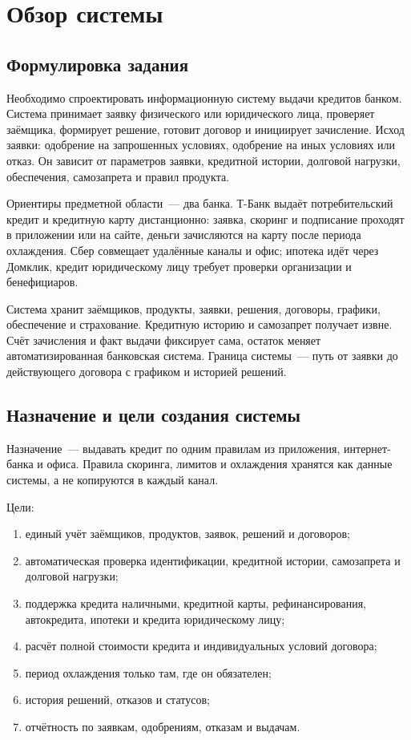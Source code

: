 \documentclass[14pt,a4paper]{extarticle}
\begin{document}
\section{Обзор системы}

\subsection{Формулировка задания}

Необходимо спроектировать информационную систему выдачи кредитов банком. Система принимает заявку физического или юридического лица, проверяет заёмщика, формирует решение, готовит договор и инициирует зачисление. Исход заявки: одобрение на запрошенных условиях, одобрение на иных условиях или отказ. Он зависит от параметров заявки, кредитной истории, долговой нагрузки, обеспечения, самозапрета и правил продукта.

Ориентиры предметной области~--- два банка. Т-Банк выдаёт потребительский кредит и кредитную карту дистанционно: заявка, скоринг и подписание проходят в приложении или на сайте, деньги зачисляются на карту после периода охлаждения. Сбер совмещает удалённые каналы и офис; ипотека идёт через Домклик, кредит юридическому лицу требует проверки организации и бенефициаров.

Система хранит заёмщиков, продукты, заявки, решения, договоры, графики, обеспечение и страхование. Кредитную историю и самозапрет получает извне. Счёт зачисления и факт выдачи фиксирует сама, остаток меняет автоматизированная банковская система. Граница системы~--- путь от заявки до действующего договора с графиком и историей решений.

\subsection{Назначение и цели создания системы}

Назначение~--- выдавать кредит по одним правилам из приложения, интернет-банка и офиса. Правила скоринга, лимитов и охлаждения хранятся как данные системы, а не копируются в каждый канал.

Цели:

\begin{enumerate}
\item единый учёт заёмщиков, продуктов, заявок, решений и договоров;
\item автоматическая проверка идентификации, кредитной истории, самозапрета и долговой нагрузки;
\item поддержка кредита наличными, кредитной карты, рефинансирования, автокредита, ипотеки и кредита юридическому лицу;
\item расчёт полной стоимости кредита и индивидуальных условий договора;
\item период охлаждения только там, где он обязателен;
\item история решений, отказов и статусов;
\item отчётность по заявкам, одобрениям, отказам и выдачам.
\end{enumerate}
\end{document}
